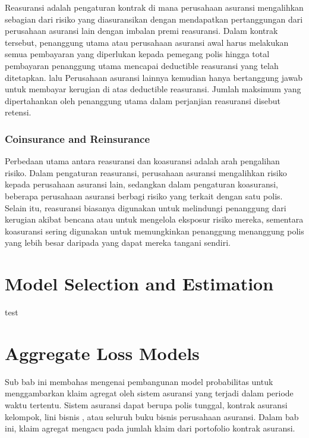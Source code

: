\documentclass[
]{book}
\begin{document}
Reasuransi adalah pengaturan kontrak di mana perusahaan asuransi mengalihkan sebagian dari risiko yang diasuransikan dengan mendapatkan pertanggungan dari perusahaan asuransi lain dengan imbalan premi reasuransi. Dalam kontrak tersebut, penanggung utama atau perusahaan asuransi awal harus melakukan semua pembayaran yang diperlukan kepada pemegang polis hingga total pembayaran penanggung utama mencapai deductible reasuransi yang telah ditetapkan. lalu Perusahaan asuransi lainnya kemudian hanya bertanggung jawab untuk membayar kerugian di atas deductible reasuransi. Jumlah maksimum yang dipertahankan oleh penanggung utama dalam perjanjian reasuransi disebut retensi.

\hypertarget{coinsurance-and-reinsurance}{%
\subsection{Coinsurance and Reinsurance}\label{coinsurance-and-reinsurance}}

Perbedaan utama antara reasuransi dan koasuransi adalah arah pengalihan risiko. Dalam pengaturan reasuransi, perusahaan asuransi mengalihkan risiko kepada perusahaan asuransi lain, sedangkan dalam pengaturan koasuransi, beberapa perusahaan asuransi berbagi risiko yang terkait dengan satu polis. Selain itu, reasuransi biasanya digunakan untuk melindungi penanggung dari kerugian akibat bencana atau untuk mengelola eksposur risiko mereka, sementara koasuransi sering digunakan untuk memungkinkan penanggung menanggung polis yang lebih besar daripada yang dapat mereka tangani sendiri.

\hypertarget{model-selection-and-estimation}{%
\chapter{Model Selection and Estimation}\label{model-selection-and-estimation}}

test

\hypertarget{aggregate-loss-models}{%
\chapter{Aggregate Loss Models}\label{aggregate-loss-models}}

Sub bab ini membahas mengenai pembangunan model probabilitas untuk menggambarkan klaim agregat oleh sistem asuransi yang terjadi dalam periode waktu tertentu. Sistem asuransi dapat berupa polis tunggal, kontrak asuransi kelompok, lini bisnis , atau seluruh buku bisnis perusahaan asuransi. Dalam bab ini, klaim agregat mengacu pada jumlah klaim dari portofolio kontrak asuransi.
\end{document}

